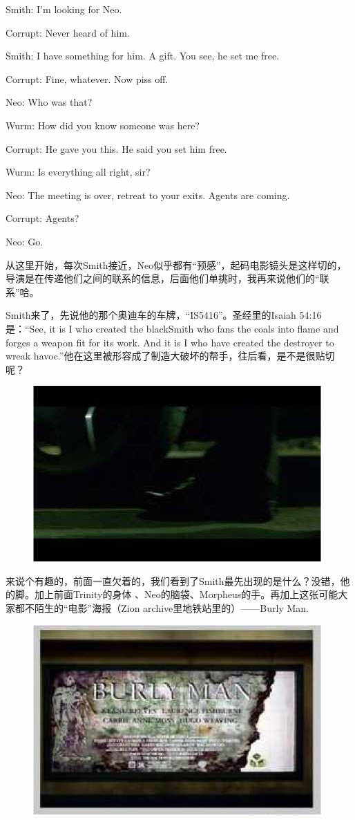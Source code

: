 \documentclass[UTF8]{ctexart}
\newenvironment{myquote}{\color{green} \setlength{\leftskip}{6em} \setlength{\rightskip}{4em} \setlength{\parindent}{-2em}}{\par}
\begin{document}
\begin{myquote}
Smith: I'm looking for Neo.

Corrupt: Never heard of him.

Smith: I have something for him. A gift. You see, he set me free.

Corrupt: Fine, whatever. Now piss off.

Neo: Who was that?

Wurm: How did you know someone was here?

Corrupt: He gave you this. He said you set him free.

Wurm: Is everything all right, sir?

Neo: The meeting is over, retreat to your exits. Agents are coming.

Corrupt: Agents?

Neo: Go.
\end{myquote}

从这里开始，每次Smith接近，Neo似乎都有“预感”，起码电影镜头是这样切的，导演是在传递他们之间的联系的信息，后面他们单挑时，我再来说他们的“联系”哈。

Smith来了，先说他的那个奥迪车的车牌，“IS5416”。圣经里的Isaiah 54:16是：“See, it is I who created the blackSmith who fans the coals into flame and forges a weapon fit for its work. And it is I who have created the destroyer to wreak havoc.”他在这里被形容成了制造大破坏的帮手，往后看，是不是很贴切呢？

\begin{figure}[htb]
\centering
\includegraphics[width=0.5\linewidth]{fig/read_reloaded-18}
\end{figure}

来说个有趣的，前面一直欠着的，我们看到了Smith最先出现的是什么？没错，他的脚。加上前面Trinity的身体 、Neo的脑袋、Morpheus的手。再加上这张可能大家都不陌生的“电影”海报（Zion archive里地铁站里的）——Burly Man.

\begin{figure}[htb]
\centering
\includegraphics[width=0.5\linewidth]{fig/read_reloaded-19}
\end{figure}
\end{document}
